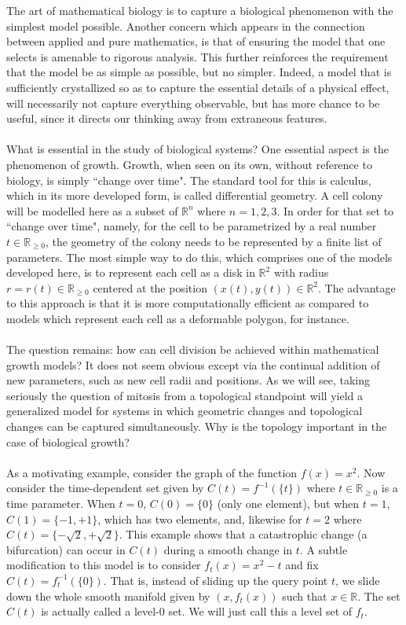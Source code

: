 \introduction
The art of mathematical biology is to capture a biological phenomenon with the simplest model possible. Another concern which appears in the connection between applied and pure mathematics, is that of ensuring the model that one selects is amenable to rigorous analysis. This further reinforces the requirement that the model be as simple as possible, but no simpler. Indeed, a model that is sufficiently crystallized so as to capture the essential details of a physical effect, will necessarily not capture everything observable, but has more chance to be useful, since it directs our thinking away from extraneous features.
\\
\\
What is essential in the study of biological systems? One essential aspect is the phenomenon of growth. Growth, when seen on its own, without reference to biology, is simply ``change over time". The standard tool for this is calculus, which in its more developed form, is called differential geometry. A cell colony will be modelled here as a subset of $\mathbb{R}^n$ where $n = 1,2,3$. In order for that set to ``change over time", namely, for the cell to be parametrized by a real number $t \in \mathbb{R}_{\geq 0}$, the geometry of the colony needs to be represented by a finite list of parameters. The most simple way to do this, which comprises one of the models developed here, is to represent each cell as a disk in $\mathbb{R}^2$ with radius $r = r(t) \in \mathbb{R}_{\geq 0}$ centered at the position $(x(t),y(t)) \in \mathbb{R}^2$. The advantage to this approach is that it is more computationally efficient as compared to models which represent each cell as a deformable polygon, for instance.
\\
\\
The question remains: how can cell division be achieved within mathematical growth models? It does not seem obvious except via the continual addition of new parameters, such as new cell radii and positions. As we will see, taking seriously the question of mitosis from a topological standpoint will yield a generalized model for systems in which geometric changes and topological changes can be captured simultaneously. Why is the topology important in the case of biological growth? 
\\
\\
As a motivating example, consider the graph of the function $f(x) = x^2$. Now consider the time-dependent set given by $C(t) = f^{-1} (\{t\})$ where $t \in \mathbb{R}_{\geq 0}$ is a time parameter. When $t=0$, $C(0) = \{ 0\}$ (only one element), but when $t=1$, $C(1) = \{ -1, +1  \}$, which has two elements, and, likewise for $t=2$ where $C(t) = \{ -\sqrt{2}, +\sqrt{2}  \}$. This example shows that a catastrophic change (a bifurcation) can occur in $C(t)$ during a smooth change in $t$. A subtle modification to this model is to consider $f_t(x) = x^2-t$ and fix $C(t) = f^{-1}_t(\{0 \})$. That is, instead of sliding up the query point $t$, we slide down the whole smooth manifold given by $(x,f_t(x))$ such that $x \in \mathbb{R}$. The set $C(t)$ is actually called a level-$0$ set. We will just call this a level set of $f_t$.
